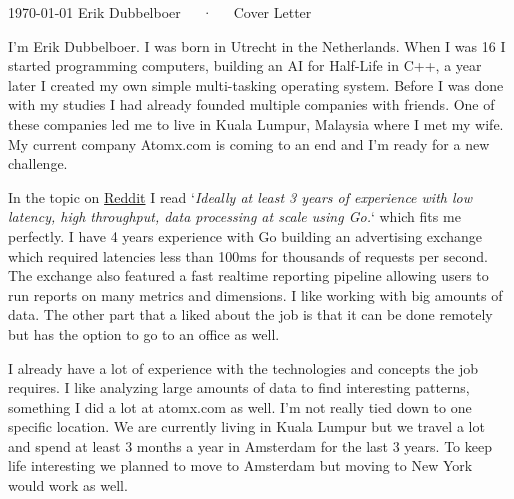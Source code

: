 \documentclass[11pt, a4paper]{awesome-cv}
\begin{document}
\makecvheader[R]

\makecvfooter
  {\today}
  {Erik Dubbelboer~~~·~~~Cover Letter}
  {}

\makelettertitle

\begin{cvletter}

I'm Erik Dubbelboer. I was born in Utrecht in the Netherlands. When I was 16 I started programming computers, building an AI for Half-Life in C++, a year later I created my own simple multi-tasking operating system. Before I was done with my studies I had already founded multiple companies with friends. One of these companies led me to live in Kuala Lumpur, Malaysia where I met my wife. My current company Atomx.com is coming to an end and I'm ready for a new challenge.

In the topic on \href{https://www.reddit.com/r/golang/comments/8wdfk6/digitalocean\_is\_looking\_for\_a\_sr\_backend\_go/}{\textcolor{link}{Reddit}} I read `\textit{Ideally at least 3 years of experience with low latency, high throughput, data processing at scale using Go.}` which fits me perfectly. I have 4 years experience with Go building an advertising exchange which required latencies less than 100ms for thousands of requests per second. The exchange also featured a fast realtime reporting pipeline allowing users to run reports on many metrics and dimensions. I like working with big amounts of data. The other part that a liked about the job is that it can be done remotely but has the option to go to an office as well.

I already have a lot of experience with the technologies and concepts the job requires. I like analyzing large amounts of data to find interesting patterns, something I did a lot at atomx.com as well. I'm not really tied down to one specific location. We are currently living in Kuala Lumpur but we travel a lot and spend at least 3 months a year in Amsterdam for the last 3 years. To keep life interesting we planned to move to Amsterdam but moving to New York would work as well.

\end{cvletter}


\makeletterclosing
\end{document}
